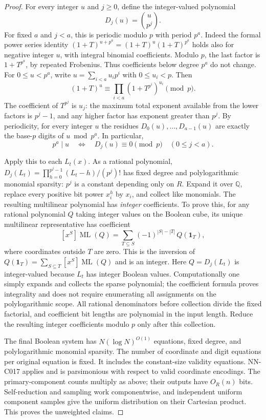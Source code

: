 \begin{proof}
For every integer $u$ and $j\geq0$, define the integer-valued polynomial
\[
 D_j(u)=\binom{u}{p^j}.
\]
For fixed $a$ and $j<a$, this is periodic modulo $p$ with period $p^a$. Indeed the formal power series identity
$(1+T)^{u+p^a}=(1+T)^u(1+T)^{p^a}$ holds also for negative integer $u$, with integral binomial coefficients. Modulo $p$, the last factor is $1+T^{p^a}$, by repeated Frobenius. Thus coefficients below degree $p^a$ do not change. For $0\leq u<p^a$, write $u=\sum_{i<a}u_ip^i$ with $0\leq u_i<p$. Then
\[
 (1+T)^u\equiv\prod_{i<a}(1+T^{p^i})^{u_i}\pmod p.
\]
The coefficient of $T^{p^j}$ is $u_j$: the maximum total exponent available from the lower factors is $p^j-1$, and any higher factor has exponent greater than $p^j$. By periodicity, for every integer $u$ the residues $D_0(u),\ldots,D_{a-1}(u)$ are exactly the base-$p$ digits of $u\bmod p^a$. In particular,
\[
 p^a\mid u\quad\Longleftrightarrow\quad
 D_j(u)\equiv0\pmod p\quad(0\leq j<a).
\]

Apply this to each $L_t(x)$. As a rational polynomial,
$D_j(L_t)=\prod_{h=0}^{p^j-1}(L_t-h)/(p^j)!$ has fixed degree and polylogarithmic monomial sparsity: $p^j$ is a constant depending only on $R$. Expand it over $\mathbb Q$, replace every positive bit power $x_i^h$ by $x_i$, and collect like monomials. The resulting multilinear polynomial has \emph{integer} coefficients. To prove this, for any rational polynomial $Q$ taking integer values on the Boolean cube, its unique multilinear representative has coefficient
\[
 [x^S]\operatorname{ML}(Q)
   =\sum_{T\subseteq S}(-1)^{|S|-|T|}\,Q(\mathbf1_T),
\]
where coordinates outside $T$ are zero. This is the inversion of
$Q(\mathbf1_T)=\sum_{S\subseteq T}[x^S]\operatorname{ML}(Q)$ and is an integer. Here $Q=D_j(L_t)$ is integer-valued because $L_t$ has integer Boolean values. Computationally one simply expands and collects the sparse polynomial; the coefficient formula proves integrality and does not require enumerating all assignments on the polylogarithmic scope. All rational denominators before collection divide the fixed factorial, and coefficient bit lengths are polynomial in the input length. Reduce the resulting integer coefficients modulo $p$ only after this collection.

The final Boolean system has $N(\log N)^{O(1)}$ equations, fixed degree, and polylogarithmic monomial sparsity. The number of coordinate and digit equations per original equation is fixed. It includes the constant-size validity equations. NN-C017 applies and is parsimonious with respect to valid coordinate encodings. The primary-component counts multiply as above; their outputs have $O_R(n)$ bits. Self-reduction and sampling work componentwise, and independent uniform component samples give the uniform distribution on their Cartesian product. This proves the unweighted claims.


\end{proof}
